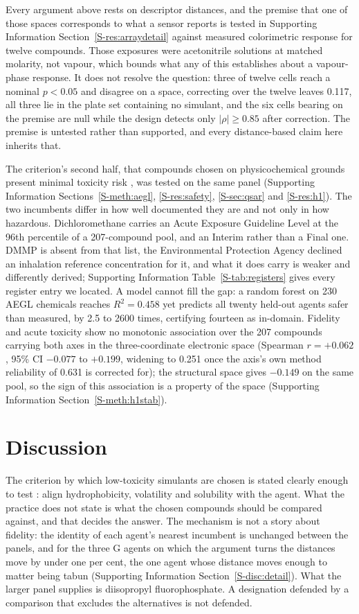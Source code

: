 \documentclass[journal=ancham,manuscript=article,margin=1in]{achemso}
\begin{document}
Every argument above rests on descriptor distances, and the premise that one of
those spaces corresponds to what a sensor reports is tested in Supporting
Information Section~\ref{S-res:arraydetail} against measured colorimetric
response for twelve compounds. Those exposures were acetonitrile
solutions at matched molarity, not vapour, which bounds what any of this
establishes about a vapour-phase response. It does not resolve the question:
three of twelve cells reach a nominal $p<0.05$ and disagree on a space,
correcting over the twelve leaves 0.117, all three lie in the plate set
containing no simulant, and the six cells bearing on the premise are null while
the design detects only $|\rho| \ge 0.85$ after correction. The premise is
untested rather than supported, and every distance-based claim here inherits
that.

The criterion's second half, that compounds chosen on physicochemical grounds
present minimal toxicity risk \cite{webb2025}, was tested on the same panel
(Supporting Information Sections~\ref{S-meth:aegl}, \ref{S-res:safety},
\ref{S-sec:qsar} and \ref{S-res:h1}). The two incumbents differ in how well
documented they are and not only in how hazardous. Dichloromethane carries an
Acute Exposure Guideline Level at the 96th percentile of a 207-compound pool,
and an Interim rather than a Final one. DMMP is absent from that list, the
Environmental Protection Agency declined an inhalation reference concentration
for it, and what it does carry is weaker and differently derived; Supporting
Information Table~\ref{S-tab:registers} gives every register entry we
located. A model cannot fill the gap: a random forest on 230 AEGL chemicals
reaches $R^{2}=0.458$ yet predicts all twenty held-out agents safer than
measured, by 2.5 to 2600 times, certifying fourteen as in-domain. Fidelity and
acute toxicity show no monotonic association over the 207 compounds carrying
both axes in the three-coordinate electronic space (Spearman $r=+0.062$,
95\% CI $-0.077$ to $+0.199$, widening to 0.251 once the axis's own method
reliability of 0.631 is corrected for); the structural space gives $-0.149$ on
the same pool, so the sign of this association is a property of the space
(Supporting Information Section~\ref{S-meth:h1stab}).

\section{Discussion}
\label{sec:discussion}

The criterion by which low-toxicity simulants are chosen is stated clearly
enough to test \cite{webb2025}: align hydrophobicity, volatility and solubility
with the agent. What the practice does not state is what the chosen compounds
should be compared against, and that decides the answer. The mechanism is not a
story about fidelity: the identity of each agent's nearest incumbent is unchanged
between the panels, and for the three G agents on which the argument turns the
distances move by under one per cent, the one agent whose distance moves enough
to matter being tabun (Supporting Information Section~\ref{S-disc:detail}). What
the larger panel supplies is diisopropyl fluorophosphate. A designation defended
by a comparison that excludes the alternatives is not defended.
\end{document}
